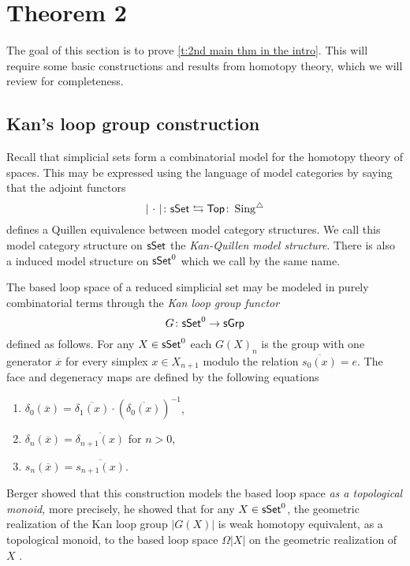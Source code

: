 
\section{Theorem 2}

The goal of this section is to prove \cref{t:2nd main thm in the intro}. This will require some basic constructions and results from homotopy theory, which we will review for completeness. 

\subsection{Kan's loop group construction}

Recall that simplicial sets form a combinatorial model for the homotopy theory of spaces.
This may be expressed using the language of model categories by saying that the adjoint functors
\begin{equation*}
\vert{\ \cdot\ }\vert \colon \mathsf{sSet} \leftrightarrows \mathsf{Top} \colon \operatorname{Sing^{\triangle}}
\end{equation*}
defines a Quillen equivalence between model category structures.
We call this model category structure on $\mathsf{sSet}$ the \textit{Kan-Quillen model structure}.
There is also a induced model structure on $\mathsf{sSet}^0$ which we call by the same name.

The based loop space of a reduced simplicial set may be modeled in purely combinatorial terms through the \textit{Kan loop group functor} 
\begin{equation*}
G \colon \mathsf{sSet}^0 \to \mathsf{sGrp}
\end{equation*}
defined as follows.
For any $X \in \mathsf{sSet}^0$ each $G(X)_n$ is the group with one generator $\overline{x}$ for every simplex $x \in X_{n+1}$ modulo the relation $\overline{s_0(x)} = e$.
The face and degeneracy maps are defined by the following equations
\begin{enumerate}
    \item $\delta_0(\overline{x}) = \overline{\delta_1(x)} \cdot (\overline{\delta_0(x)})^{-1}$,
    \item $\delta_n(\overline{x})= \overline{\delta_{n+1}(x)}$ for $n >0$,
    \item $s_n(\overline{x})= \overline{s_{n+1}(x)}$.
\end{enumerate}

Berger showed that this construction models the based loop space \textit{as a topological monoid,} more precisely, he showed that for any $X \in \mathsf{sSet}^0$, the geometric realization of the Kan loop group $|G(X)|$ is weak homotopy equivalent, as a topological monoid, to the based loop space $\Omega|X|$ on the geometric realization of $X$ \cite{berger1995loops}.

